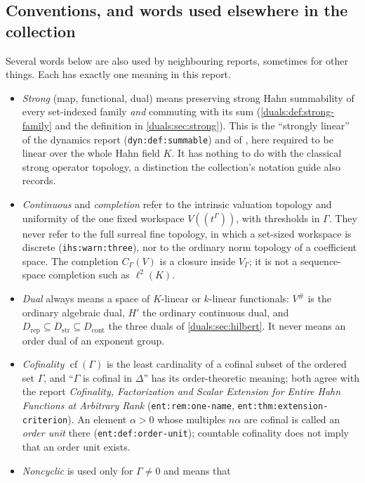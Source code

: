 \documentclass[11pt,letterpaper]{article}
\numberwithin{equation}{section}
\theoremstyle{definition}
\theoremstyle{remark}
\newcommand{\Dstr}{D_{\mathrm{str}}}
\newcommand{\Dcont}{D_{\mathrm{cont}}}
\newcommand{\Drep}{D_{\mathrm{rep}}}
\newcommand{\ihs}[1]{\texttt{ihs:#1}}
\newcommand{\lab}[1]{\texttt{#1}}
\begin{document}
\subsection{Conventions, and words used elsewhere in the collection}
\label{duals:sec:conventions}
Several words below are also used by neighbouring reports, sometimes for
other things. Each has exactly one meaning in this report.
\begin{itemize}
\item \emph{Strong} (map, functional, dual) means preserving strong Hahn
 summability of every set-indexed family \emph{and} commuting with its sum
 (\cref{duals:def:strong-family} and the definition in
 \cref{duals:sec:strong}). This is the ``strongly linear'' of the dynamics
 report (\lab{dyn:def:summable}) and of \cite{BKKPS}, here required to be
 linear over the whole Hahn field $K$. It has nothing to do with the
 classical strong operator topology, a distinction the collection's
 notation guide also records.
\item \emph{Continuous} and \emph{completion} refer to the intrinsic
 valuation topology and uniformity of the one fixed workspace
 $V((t^\Gamma))$, with thresholds in $\Gamma$. They never refer to the full
 surreal fine topology, in which a set-sized workspace is discrete
 (\ihs{warn:three}), nor to the ordinary norm topology of a coefficient
 space. The completion $C_\Gamma(V)$ is a closure inside $V_\Gamma$; it is
 not a sequence-space completion such as $\ell^2(K)$.
\item \emph{Dual} always means a space of $K$-linear or $k$-linear
 functionals: $V^\#$ is the ordinary algebraic dual, $H'$ the ordinary
 continuous dual, and $\Drep\subseteq\Dstr\subseteq\Dcont$ the three duals
 of \cref{duals:sec:hilbert}. It never means an order dual of an exponent
 group.
\item \emph{Cofinality} $\operatorname{cf}(\Gamma)$ is the least cardinality
 of a cofinal subset of the ordered set $\Gamma$, and ``$\Gamma$ is cofinal
 in $\Delta$'' has its order-theoretic meaning; both agree with the report
 \emph{Cofinality, Factorization and Scalar Extension for Entire Hahn
 Functions at Arbitrary Rank} \cite{RepoEntire} (\lab{ent:rem:one-name},
 \lab{ent:thm:extension-criterion}). An element $\alpha>0$ whose multiples
 $n\alpha$ are cofinal is called an \emph{order unit} there
 (\lab{ent:def:order-unit}); countable cofinality does not imply that an
 order unit exists.
\item \emph{Noncyclic} is used only for $\Gamma\ne0$ and means that

\end{itemize}
\end{document}
